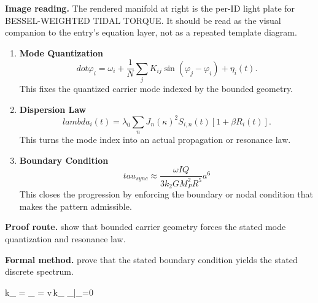 \begin{samepage}
\noindent\begin{minipage}[t]{0.45\linewidth}
\vspace{0pt}
\raggedright
\scriptsize\textbf{Image reading.} The rendered manifold at right is the per-ID light plate for BESSEL-WEIGHTED TIDAL TORQUE. It should be read as the visual companion to the entry's equation layer, not as a repeated template diagram.\par
\end{minipage}\hfill
\begin{minipage}[t]{0.53\linewidth}
\vspace*{-0.10in}
\raggedright
{}
\end{minipage}
\end{samepage}

\clearpage


\begin{enumerate}[leftmargin=1.6em,itemsep=9pt,topsep=6pt]
\item \textbf{Mode Quantization}
\[
dot\varphi_i = \omega_i + \frac{1}{N}\sum_j K_{ij}\sin(\varphi_j-\varphi_i) + \eta_i(t).
\]
This fixes the quantized carrier mode indexed by the bounded geometry.

\item \textbf{Dispersion Law}
\[
lambda_i(t) = \lambda_0 \sum_n J_n(\kappa)^2 S_{i,n}(t) [1+\beta R_i(t)].
\]
This turns the mode index into an actual propagation or resonance law.

\item \textbf{Boundary Condition}
\[
tau_{sync} \approx \frac{\omega I Q}{3 k_2 G M_P^2 R^5} a^6
\]
This closes the progression by enforcing the boundary or nodal condition that makes the pattern admissible.
\end{enumerate}

\textbf{Proof route.} show that bounded carrier geometry forces the stated mode quantization and resonance law.

\textbf{Formal method.} prove that the stated boundary condition yields the stated discrete spectrum.

\medskip
{}

\begin{tzpsnapshot}
\end{tzpsnapshot}

\tzpequationlinks
  {k_{} = }
  {\omega_{} = v\,k_{}}
  {\Phi_{}|_{\partial\Omega}=0}
